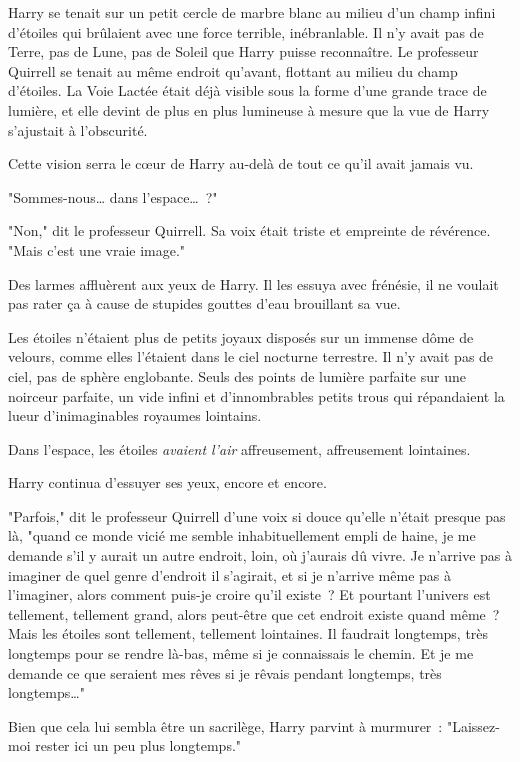 Harry se tenait sur un petit cercle de marbre blanc au milieu d'un champ infini d'étoiles qui brûlaient avec une force terrible, inébranlable. Il n'y avait pas de Terre, pas de Lune, pas de Soleil que Harry puisse reconnaître. Le professeur Quirrell se tenait au même endroit qu'avant, flottant au milieu du champ d'étoiles. La Voie Lactée était déjà visible sous la forme d'une grande trace de lumière, et elle devint de plus en plus lumineuse à mesure que la vue de Harry s'ajustait à l'obscurité.

Cette vision serra le cœur de Harry au-delà de tout ce qu'il avait jamais vu.

"Sommes-nous… dans l'espace…~?"

"Non," dit le professeur Quirrell. Sa voix était triste et empreinte de révérence. "Mais c'est une vraie image."

Des larmes affluèrent aux yeux de Harry. Il les essuya avec frénésie, il ne voulait pas rater ça à cause de stupides gouttes d'eau brouillant sa vue.

Les étoiles n'étaient plus de petits joyaux disposés sur un immense dôme de velours, comme elles l'étaient dans le ciel nocturne terrestre. Il n'y avait pas de ciel, pas de sphère englobante. Seuls des points de lumière parfaite sur une noirceur parfaite, un vide infini et d'innombrables petits trous qui répandaient la lueur d'inimaginables royaumes lointains.

Dans l'espace, les étoiles \emph{avaient l'air} affreusement, affreusement lointaines.

Harry continua d'essuyer ses yeux, encore et encore.

"Parfois," dit le professeur Quirrell d'une voix si douce qu'elle n'était presque pas là, "quand ce monde vicié me semble inhabituellement empli de haine, je me demande s'il y aurait un autre endroit, loin, où j'aurais dû vivre. Je n'arrive pas à imaginer de quel genre d'endroit il s'agirait, et si je n'arrive même pas à l'imaginer, alors comment puis-je croire qu'il existe~? Et pourtant l'univers est tellement, tellement grand, alors peut-être que cet endroit existe quand même~? Mais les étoiles sont tellement, tellement lointaines. Il faudrait longtemps, très longtemps pour se rendre là-bas, même si je connaissais le chemin. Et je me demande ce que seraient mes rêves si je rêvais pendant longtemps, très longtemps…"

Bien que cela lui sembla être un sacrilège, Harry parvint à murmurer~: "Laissez-moi rester ici un peu plus longtemps."

